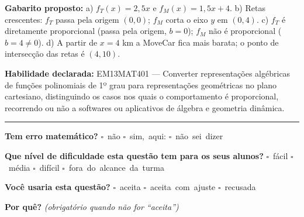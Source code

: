 \documentclass[11pt,a4paper]{article}
\begin{document}
\begin{samepage}
\textbf{Gabarito proposto:} a) $f_T(x)=2{,}5x$ e $f_M(x)=1{,}5x+4$. b) Retas crescentes: $f_T$ passa pela origem $(0,0)$; $f_M$ corta o eixo $y$ em $(0,4)$. c) $f_T$ é diretamente proporcional (passa pela origem, $b=0$); $f_M$ não é proporcional ($b=4\neq 0$). d) A partir de $x=4$ km a MoveCar fica mais barata; o ponto de intersecção das retas é $(4,10)$.

\textbf{Habilidade declarada:} EM13MAT401 --- Converter representações algébricas de funções polinomiais de 1º grau para representações geométricas no plano cartesiano, distinguindo os casos nos quais o comportamento é proporcional, recorrendo ou não a softwares ou aplicativos de álgebra e geometria dinâmica.
\end{samepage}

\noindent\rule{\linewidth}{0.4pt}
\textbf{Tem erro matemático?}\quad
\mbox{$\square$~não} \quad \mbox{$\square$~sim, aqui:} \underline{\hspace{5cm}}
\quad \mbox{$\square$~não sei dizer}

\textbf{Que nível de dificuldade esta questão tem para os seus alunos?}\quad
\mbox{$\square$~fácil} \quad \mbox{$\square$~média} \quad
\mbox{$\square$~difícil} \quad \mbox{$\square$~fora do alcance da turma}

\textbf{Você usaria esta questão?}\quad
\mbox{$\square$~aceita} \quad \mbox{$\square$~aceita com ajuste} \quad
\mbox{$\square$~recusada}

\textbf{Por quê?} \emph{(obrigatório quando não for ``aceita'')}

\underline{\hspace{\linewidth}}

\underline{\hspace{\linewidth}}
\vspace{0.6em}
\end{document}
